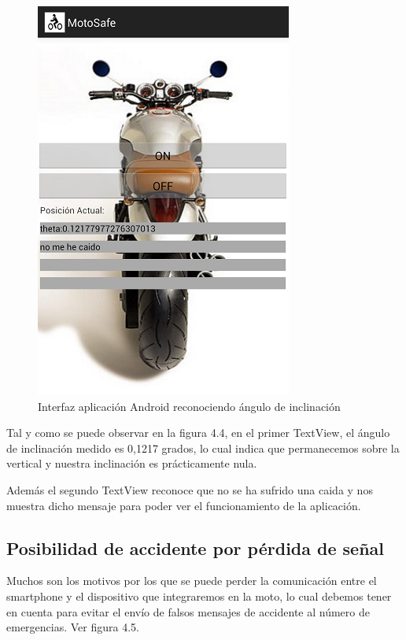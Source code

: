 		\begin{figure}[h]
			\centering
			\includegraphics{imagenes/NoAccidente.png}
			\caption{Interfaz aplicación Android reconociendo ángulo de inclinación}
			\label{contexto:figura}
		\end{figure}
		
		Tal y como se puede observar en la figura 4.4, en el primer TextView, el ángulo de inclinación medido es 0,1217 grados, lo cual indica que permanecemos sobre la vertical y nuestra inclinación es prácticamente nula.
		
		Además el segundo TextView reconoce que no se ha sufrido una caida y nos muestra dicho mensaje para poder ver el funcionamiento de la aplicación.
		
		\subsection{Posibilidad de accidente por pérdida de se\~nal}
		
		Muchos son los motivos por los que se puede perder la comunicación entre el smartphone y el dispositivo que integraremos en la moto, lo cual debemos tener en cuenta para evitar el envío de falsos mensajes de accidente al número de emergencias. Ver figura 4.5.
		

